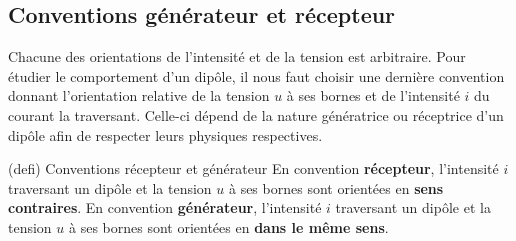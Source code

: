 \documentclass[../../main/main.tex]{subfiles}
\begin{document}
\subsection{Conventions générateur et récepteur}
Chacune des orientations de l'intensité et de la tension est arbitraire. Pour
étudier le comportement d'un dipôle, il nous faut choisir une dernière
convention donnant l'orientation relative de la tension $u$ à ses bornes et de
l'intensité $i$ du courant la traversant. Celle-ci dépend de la nature
génératrice ou réceptrice d'un dipôle afin de respecter leurs physiques
respectives.

\begin{tcb}[label=def:convrg, sidebyside, righthand width=.3\linewidth](defi)
	{Conventions récepteur et générateur}
	En convention \textbf{récepteur}, l'intensité $i$ traversant un dipôle et la
	tension $u$ à ses bornes sont orientées en \textbf{sens contraires}.
	\bigbreak
	En convention \textbf{générateur}, l'intensité $i$ traversant un dipôle et la
	tension $u$ à ses bornes sont orientées en \textbf{dans le même sens}.
	\tcblower
	\begin{center}
\end{center}
\end{tcb}
\end{document}
